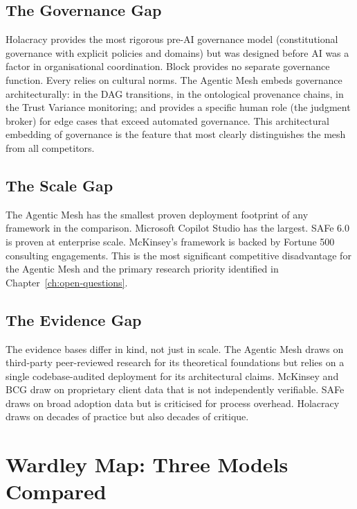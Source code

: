 \subsection{The Governance Gap}

Holacracy provides the most rigorous pre-AI governance model (constitutional governance with explicit policies and domains) but was designed before AI was a factor in organisational coordination. Block provides no separate governance function. Every relies on cultural norms. The Agentic Mesh embeds governance architecturally: in the DAG transitions, in the ontological provenance chains, in the Trust Variance monitoring; and provides a specific human role (the judgment broker) for edge cases that exceed automated governance. This architectural embedding of governance is the feature that most clearly distinguishes the mesh from all competitors.

\subsection{The Scale Gap}

The Agentic Mesh has the smallest proven deployment footprint of any framework in the comparison. Microsoft Copilot Studio has the largest. SAFe 6.0 is proven at enterprise scale. McKinsey's framework is backed by Fortune 500 consulting engagements. This is the most significant competitive disadvantage for the Agentic Mesh and the primary research priority identified in Chapter~\ref{ch:open-questions}.

\subsection{The Evidence Gap}

The evidence bases differ in kind, not just in scale. The Agentic Mesh draws on third-party peer-reviewed research \parencite{DellAcqua2026, Randazzo2024, Acemoglu2025} for its theoretical foundations but relies on a single codebase-audited deployment for its architectural claims. McKinsey and BCG draw on proprietary client data that is not independently verifiable. SAFe draws on broad adoption data but is criticised for process overhead. Holacracy draws on decades of practice but also decades of critique.

\section{Wardley Map: Three Models Compared}

